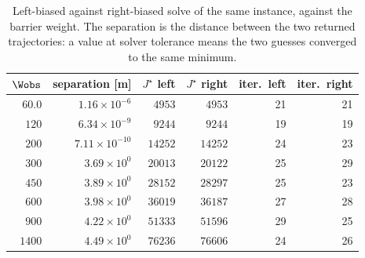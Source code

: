 \begin{table}[htbp]
  \centering
  \small
  \caption{Left-biased against right-biased solve of the same instance, against the barrier weight. The separation is the distance between the two returned trajectories: a value at solver tolerance means the two guesses converged to the same minimum.}
  \label{res:tab:bif}
  \begin{tabular}{rrrrrr}
    \toprule
    $\Wobs$ & separation [m] & $J^\star$ left & $J^\star$ right & iter.\ left & iter.\ right \\
    \midrule
    $60.0$ & $1.16\times 10^{-6}$ & $4953$ & $4953$ & 21 & 21 \\
    $120$ & $6.34\times 10^{-9}$ & $9244$ & $9244$ & 19 & 19 \\
    $200$ & $7.11\times 10^{-10}$ & $14252$ & $14252$ & 24 & 23 \\
    $300$ & $3.69\times 10^{0}$ & $20013$ & $20122$ & 25 & 29 \\
    $450$ & $3.89\times 10^{0}$ & $28152$ & $28297$ & 25 & 23 \\
    $600$ & $3.98\times 10^{0}$ & $36019$ & $36187$ & 27 & 28 \\
    $900$ & $4.22\times 10^{0}$ & $51333$ & $51596$ & 29 & 25 \\
    $1400$ & $4.49\times 10^{0}$ & $76236$ & $76606$ & 24 & 26 \\
    \bottomrule
  \end{tabular}
\end{table}

